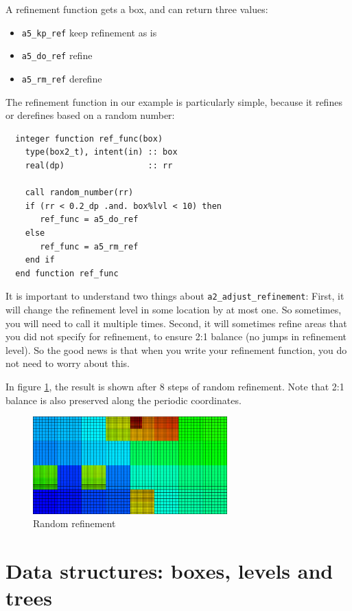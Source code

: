 \documentclass[a4paper, a4wide]{article}
\begin{document}
A refinement function gets a box, and can return three values:
\begin{itemize}
  \item \texttt{a5\_kp\_ref} keep refinement as is
  \item \texttt{a5\_do\_ref} refine
  \item \texttt{a5\_rm\_ref} derefine
\end{itemize}
The refinement function in our example is particularly simple, because it
refines or derefines based on a random number:
\begin{lstlisting}
  integer function ref_func(box)
    type(box2_t), intent(in) :: box
    real(dp)                 :: rr

    call random_number(rr)
    if (rr < 0.2_dp .and. box%lvl < 10) then
       ref_func = a5_do_ref
    else
       ref_func = a5_rm_ref
    end if
  end function ref_func
\end{lstlisting}

It is important to understand two things about \texttt{a2\_adjust\_refinement}:
First, it will change the refinement level in some location by at most one.
So sometimes, you will need to call it multiple times.
Second, it will sometimes refine areas that you did not specify for refinement,
to ensure 2:1 balance (no jumps in refinement level).
So the good news is that when you write your refinement function, you do not
need to worry about this.

In figure \ref{fig:random-refinement}, the result is shown after 8 steps of
random refinement.
Note that 2:1 balance is also preserved along the periodic coordinates.

\begin{figure}
  \centering
  \includegraphics[width=7.5cm]{figures/random_ref.png}
  \caption{Random refinement}
  \label{fig:random-refinement}
\end{figure}

\section{Data structures: boxes, levels and trees}
\label{sec:data-structures}
\end{document}
